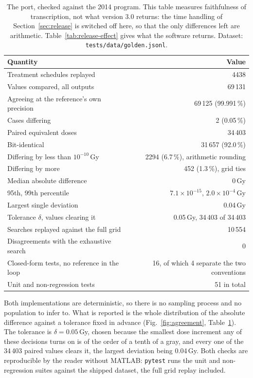\documentclass[preprint,12pt,number]{elsarticle}
\begin{document}
    \begin{table}
    \centering
    \small
    \begin{tabular}{@{}lr@{}}
    \toprule
    \textbf{Quantity} & \textbf{Value} \\
    \midrule
    Treatment schedules replayed              & 4438 \\
    Values compared, all outputs              & 69\,131 \\
    Agreeing at the reference's own precision & 69\,125 (99.991\,\%) \\
    Cases differing                           & 2 (0.05\,\%) \\[0.5ex]
    Paired equivalent doses                   & 34\,403 \\
    Bit-identical                             & 31\,657 (92.0\,\%) \\
    Differing by less than $10^{-10}$\,Gy     & 2294 (6.7\,\%), arithmetic rounding \\
    Differing by more                         & 452 (1.3\,\%), grid ties \\
    Median absolute difference                & 0\,Gy \\
    95th, 99th percentile                     & $7.1\times10^{-15}$, $2.0\times10^{-4}$\,Gy \\
    Largest single deviation                  & 0.04\,Gy \\
    Tolerance $\delta$, values clearing it    & 0.05\,Gy, 34\,403 of 34\,403 \\[0.5ex]
    Searches replayed against the full grid   & 10\,554 \\
    Disagreements with the exhaustive search  & 0 \\
    Closed-form tests, no reference in the loop & 16, of which 4 separate the two conventions \\
    Unit and non-regression tests             & 51 in total \\
    \bottomrule
    \end{tabular}
    \caption{The port, checked against the 2014 program. This table measures faithfulness of transcription, not what version 3.0 returns: the time handling of Section~\ref{sec:release} is switched off here, so that the only differences left are arithmetic. Table~\ref{tab:release-effect} gives what the software
    returns. Dataset: \texttt{tests/data/golden.jsonl}.}
    \label{tab:validation}
    \end{table}
Both implementations are deterministic, so there is no sampling process and no population to infer to. What is reported is the whole distribution of the absolute difference against a tolerance fixed in advance (Fig.~\ref{fig:agreement}, Table~\ref{tab:validation}). The tolerance is $\delta = 0.05$\,Gy, chosen because the smallest dose increment any of these decisions turns on is of the order of a tenth of a gray, and every one of the 34\,403 paired values clears it, the largest deviation being 0.04\,Gy. Both checks are reproducible by the reader without MATLAB: \texttt{pytest} runs the unit and non-regression suites against the shipped dataset, the full grid replay included.
\end{document}
